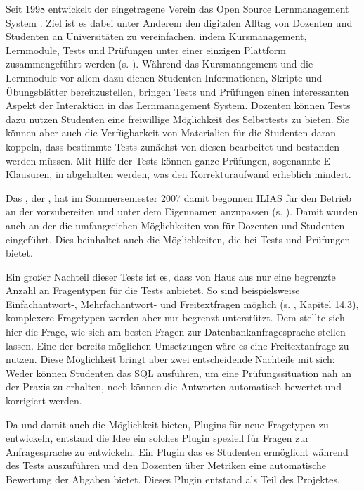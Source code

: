Seit 1998 entwickelt der eingetragene Verein  das Open Source Lernmanagement System . Ziel ist es dabei unter Anderem den digitalen Alltag von Dozenten und Studenten an Universitäten zu vereinfachen, indem Kursmanagement, Lernmodule, Tests und Prüfungen unter einer einzigen Plattform zusammengeführt werden (s. \cite{Ilias1998}). Während das Kursmanagement und die Lernmodule vor allem dazu dienen Studenten Informationen, Skripte und Übungsblätter bereitzustellen, bringen Tests und Prüfungen einen interessanten Aspekt der Interaktion in das Lernmanagement System. Dozenten können Tests dazu nutzen Studenten eine freiwillige Möglichkeit des Selbsttests zu bieten. Sie können aber auch die Verfügbarkeit von Materialien für die Studenten daran koppeln, dass bestimmte Tests zunächst von diesen bearbeitet und bestanden werden müssen. Mit Hilfe der Tests können ganze Prüfungen, sogenannte E-Klausuren, in  abgehalten werden, was den Korrekturaufwand erheblich mindert.

Das  , der  , hat im Sommersemester 2007 damit begonnen ILIAS für den Betrieb an der  vorzubereiten und unter dem Eigennamen  anzupassen (s. \cite{Studon2007}). Damit wurden auch an der  die umfangreichen Möglichkeiten von  für Dozenten und Studenten eingeführt. Dies beinhaltet auch die Möglichkeiten, die  bei Tests und Prüfungen bietet. 

Ein großer Nachteil dieser Tests ist es, dass  von Haus aus nur eine begrenzte Anzahl an Fragentypen für die Tests anbietet. So sind beispielsweise Einfachantwort-, Mehrfachantwort- und Freitextfragen möglich (s. \cite{IliasAutorenDokumentation}, Kapitel 14.3), komplexere Fragetypen werden aber nur begrenzt unterstützt. Dem  stellte sich hier die Frage, wie sich am besten Fragen zur Datenbankanfragesprache  stellen lassen. Eine der bereits möglichen Umsetzungen wäre es eine Freitextanfrage zu nutzen. Diese Möglichkeit bringt aber zwei entscheidende Nachteile mit sich: Weder können Studenten das SQL ausführen, um eine Prüfungssituation nah an der Praxis zu erhalten, noch können die Antworten automatisch bewertet und korrigiert werden.

Da  und damit auch  die Möglichkeit bieten, Plugins für neue Fragetypen zu entwickeln, entstand die Idee ein solches Plugin speziell für Fragen zur Anfragesprache  zu entwickeln. Ein Plugin das es Studenten ermöglicht  während des Tests auszuführen und den Dozenten über Metriken eine automatische Bewertung der Abgaben bietet. Dieses Plugin entstand als Teil des  Projektes.